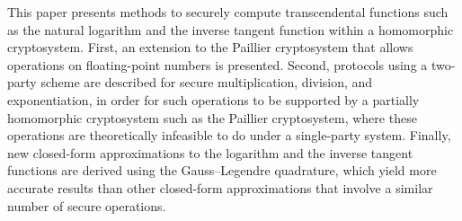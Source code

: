 This paper presents methods to securely compute transcendental functions such as the natural logarithm and the inverse tangent function within a homomorphic cryptosystem.
First, an extension to the Paillier cryptosystem that allows operations on floating-point numbers is presented. 
Second, protocols using a two-party scheme are described for secure multiplication, division, and exponentiation, in order for such operations to be supported by a partially homomorphic cryptosystem such as the Paillier cryptosystem, where these operations are theoretically infeasible to do under a single-party system.
Finally, new closed-form approximations to the logarithm and the inverse tangent functions are derived using the Gauss--Legendre quadrature, which yield more accurate results than other closed-form approximations that involve a similar number of secure operations.
